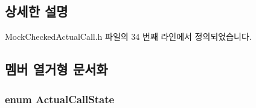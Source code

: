 \subsection{상세한 설명}


Mock\+Checked\+Actual\+Call.\+h 파일의 34 번째 라인에서 정의되었습니다.



\subsection{멤버 열거형 문서화}
\subsubsection[{\texorpdfstring{Actual\+Call\+State}{ActualCallState}}]{\setlength{\rightskip}{0pt plus 5cm}enum {\bf Actual\+Call\+State}\hspace{0.3cm}{\ttfamily [protected]}}\hypertarget{class_mock_checked_actual_call_a51287301ad26cf1a31a1e33a4fd76e8c}{}\label{class_mock_checked_actual_call_a51287301ad26cf1a31a1e33a4fd76e8c}
